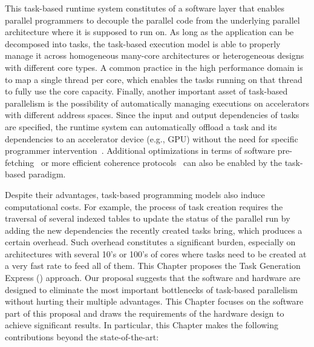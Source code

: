 This task-based runtime system constitutes of a software layer that enables parallel programmers to decouple the parallel code from the underlying parallel architecture where it is supposed to run on.
As long as the application can be decomposed into tasks, the task-based execution model is able to properly manage it across homogeneous many-core architectures or heterogeneous designs with different core types. 
A common practice in the high performance domain is to map a single thread per core, which enables the tasks running on that thread to fully use the core capacity. 
Finally, another important asset of task-based parallelism is the possibility of automatically managing executions on accelerators with different address spaces. 
Since the input and output dependencies of tasks are specified, the runtime system can automatically offload a task and its dependencies to an accelerator device (e.g., GPU) without the need for specific programmer intervention~\cite{Bueno:IPDPS2012}.
Additional optimizations in terms of software pre-fetching~\cite{Papaefstathiou2013} or more efficient coherence protocols~\cite{Manivannan2014} can also be enabled by the task-based paradigm.

Despite their advantages, task-based programming models also induce computational costs.
For example, the process of task creation requires the traversal of several indexed tables to update the status of the parallel run by adding the new dependencies the recently created tasks bring, which produces a certain overhead.
Such overhead constitutes a significant burden, especially on architectures with several 10's or 100's of cores where tasks need to be created at a very fast rate to feed all of them.
This Chapter proposes the Task Generation Express ({\proposal}) approach. 
Our proposal suggests that the software and hardware are designed to eliminate the most important bottlenecks of task-based parallelism without hurting their multiple advantages. 
This Chapter focuses on the software part of this proposal and draws the requirements of the hardware design to achieve significant results.
In particular, this Chapter makes the following contributions beyond the state-of-the-art:

